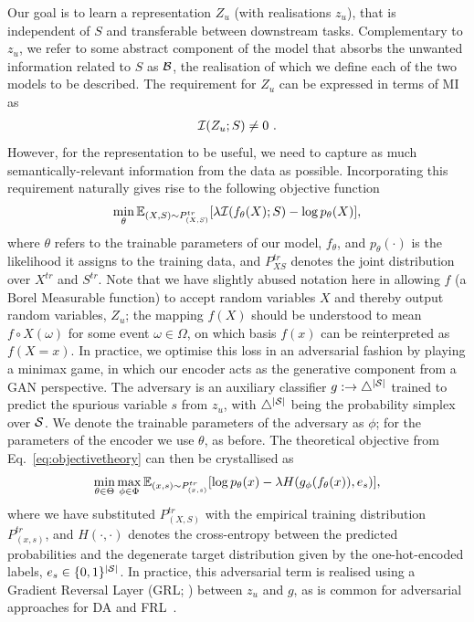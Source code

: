 Our goal is to learn a representation $Z_u$ (with realisations \(z_u\)), that is independent of $S$
and transferable between downstream tasks. 
%
Complementary to $z_u$, we refer to some abstract component of the model that absorbs the unwanted
information related to $S$ as ${\mathcal{B}}$, the realisation of which we define \wrt{} each of the two
models to be described.
The requirement for $Z_u$ can be expressed in terms of \ac{MI} as
%
\begin{align}
  {\mathcal{I}}(Z_u; S) \neq 0~.
  \label{eq:migoal}
\end{align}
%
However, for the representation to be useful, we need to capture as much semantically-relevant
information from the data as possible. 
%
Incorporating this requirement naturally gives rise to the following objective function
%
\begin{align}
  \min_{\theta}
  \mathbb{E}_{(X,S) \sim P^{tr}_{(X, S)}} [
  \lambda {\mathcal{I}}(f_\theta(X);S) -\log p_\theta(X) 
  ],
  \label{eq:objectivetheory}
\end{align}
%
where $\theta$ refers to the trainable parameters of our model, \( f_\theta \), and \(
p_\theta(\cdot) \) is the likelihood it assigns to the training data, and \( P^{tr}_{XS} \) denotes
the joint distribution over \( X^{tr} \) and \( S^{tr} \).
%
Note that we have slightly abused notation here in allowing \(f\) (a Borel Measurable function) to
accept random variables \(X\) and thereby output random variables, \(Z_u\); the mapping \(f(X)\)
should be understood to mean \( f \circ X(\omega) \) for some event \( \omega \in \Omega \), on
which basis \( f(x) \) can be reinterpreted as \( f(X=x) \).
%
In practice, we optimise this loss in an adversarial fashion by playing a minimax game, in which
our encoder acts as the generative component from a \ac{GAN} \citep{goodfellow2014generative}
perspective.
%
The adversary is an auxiliary classifier \(g: \to \bigtriangleup^{|{\mathcal{S}}|} \) trained to predict the
spurious variable \(s\) from \(z_u\), with \(\bigtriangleup^{|{\mathcal{S}}|}\) being the probability simplex
over \({\mathcal{S}}\).
%
We denote the trainable parameters of the adversary as $\phi$; for the parameters of the encoder we
use $\theta$, as before. 
%
The theoretical objective from Eq.~\ref{eq:objectivetheory} can then be crystallised as
%
\begin{align}
  \min_{ \theta \in \Theta} \max_{\phi \in \Phi}
  \mathbb{E}_{(x, s) \sim P^{tr}_{(x,s)}}[
  \log p_\theta(x)
  -\lambda H( g_\phi ( f_\theta(x) ), e_{s})
  ],
  \label{eq:objectivepractical}
\end{align} 
%
where we have substituted \( P^{ tr }_{ (X, S) } \) with the empirical training distribution \( P^{
tr }_{ (x, s) } \), and \( H(\cdot, \cdot) \) denotes the cross-entropy between the predicted
probabilities and the degenerate target distribution given by the one-hot-encoded labels, $e_{s}
\in \{0, 1\}^{|{\mathcal{S}}|}$.
%
In practice, this adversarial term is realised using a Gradient Reversal Layer (GRL;
\citealp{ganin2016domain}) between \(z_u\) and \(g\), as is common for adversarial approaches for
\acl{DA} and \acl{FRL}~\citep{edwards2016censoring}.
%
